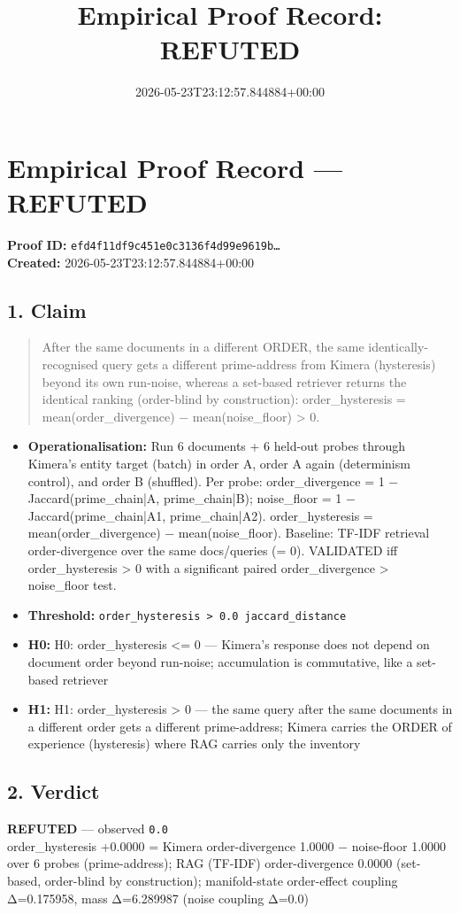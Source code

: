 \documentclass{article}
\title{Empirical Proof Record: REFUTED}
\date{2026-05-23T23:12:57.844884+00:00}
\begin{document}
\maketitle
\section*{Empirical Proof Record --- \textcolor{refuted}{\textbf{REFUTED}}}
\textbf{Proof ID:} \texttt{efd4f11df9c451e0c3136f4d99e9619b\dots}\\
\textbf{Created:} 2026-05-23T23:12:57.844884+00:00
\subsection*{1. Claim}
\begin{quote}After the same documents in a different ORDER, the same identically-recognised query gets a different prime-address from Kimera (hysteresis) beyond its own run-noise, whereas a set-based retriever returns the identical ranking (order-blind by construction): order\_hysteresis = mean(order\_divergence) − mean(noise\_floor) > 0.\end{quote}
\begin{itemize}
\item \textbf{Operationalisation:} Run 6 documents + 6 held-out probes through Kimera's entity target (batch) in order A, order A again (determinism control), and order B (shuffled). Per probe: order\_divergence = 1 − Jaccard(prime\_chain|A, prime\_chain|B); noise\_floor = 1 − Jaccard(prime\_chain|A1, prime\_chain|A2). order\_hysteresis = mean(order\_divergence) − mean(noise\_floor). Baseline: TF-IDF retrieval order-divergence over the same docs/queries (= 0). VALIDATED iff order\_hysteresis > 0 with a significant paired order\_divergence > noise\_floor test.
\item \textbf{Threshold:} \texttt{order\_hysteresis > 0.0 jaccard\_distance}
\item \textbf{H0:} H0: order\_hysteresis <= 0 — Kimera's response does not depend on document order beyond run-noise; accumulation is commutative, like a set-based retriever
\item \textbf{H1:} H1: order\_hysteresis > 0 — the same query after the same documents in a different order gets a different prime-address; Kimera carries the ORDER of experience (hysteresis) where RAG carries only the inventory
\end{itemize}
\subsection*{2. Verdict}
\textcolor{refuted}{\textbf{REFUTED}} --- observed \texttt{0.0}\\
order\_hysteresis +0.0000 = Kimera order-divergence 1.0000 − noise-floor 1.0000 over 6 probes (prime-address); RAG (TF-IDF) order-divergence 0.0000 (set-based, order-blind by construction); manifold-state order-effect coupling Δ=0.175958, mass Δ=6.289987 (noise coupling Δ=0.0)
\end{document}
